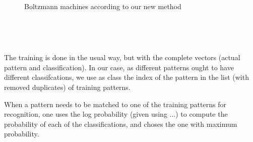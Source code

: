 \ \ \ \ \ \ \ \ \ \ \ \ \ \ \ \ \ \ \ \ \ \ \ \ \ \ \ \ \ \ \ \ \ \ \ \ \ \
\ \ \

\ \ \ \ \ \ \ \ \ \ \ \ \ \ \ \ \ \ \ \ \ \ \ \ \ \ \ \ \ \ \ \ \ \ \ \ \

\ \ \ \ \ \ \ \ \ \ \ \ \ \ \ \ \ \begin{figure}[h]
  \ \ \ \ \ \ \ \ \ \ \ \ \
  \caption{Boltzmann machines according to our new method}
\end{figure} \ \ \ \ \ \ \ \ \ \ \ \ \ \ \ \ \ \ \ \ \ \ \ \ \ \ \ \ \ \ \ \ \
\ \ \ \ \ \

\ \ \ \ \ \ \ \ \ \ \ \ \ \ \ \ \ \ \ \ \ \ \ \ \ \ \ \ \ \ \ \ \ \

The training is done in the usual way, but with the complete vectors (actual
pattern and classification). In our case, as different patterns ought to have
different classifcations, we use as class the index of the pattern in the list
(with removed duplicates) of training patterns.

When a pattern needs to be matched to one of the training patterns for
recognition, one uses the log probability (given using ...) to compute the
probability of each of the classifications, and choses the one with maximum
probability.



